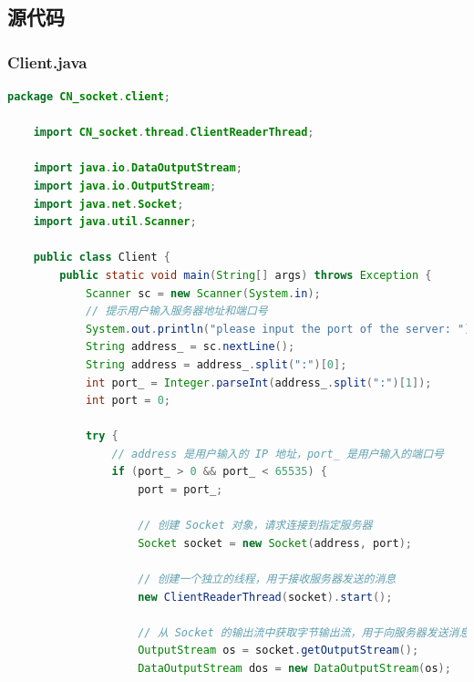 \documentclass{article}
\begin{document}
	\subsection{源代码}
	
	\subsubsection{Client.java}
	
	\begin{lstlisting}[language=Java, title=Client.java, tabsize=4]
    package CN_socket.client;
    
    import CN_socket.thread.ClientReaderThread;
    
    import java.io.DataOutputStream;
    import java.io.OutputStream;
    import java.net.Socket;
    import java.util.Scanner;
    
    public class Client {
        public static void main(String[] args) throws Exception {
            Scanner sc = new Scanner(System.in);
            // 提示用户输入服务器地址和端口号
            System.out.println("please input the port of the server: ");
            String address_ = sc.nextLine();
            String address = address_.split(":")[0];
            int port_ = Integer.parseInt(address_.split(":")[1]);
            int port = 0;
            
            try {
            	// address 是用户输入的 IP 地址，port_ 是用户输入的端口号
            	if (port_ > 0 && port_ < 65535) {
            		port = port_;
            		
            		// 创建 Socket 对象，请求连接到指定服务器
            		Socket socket = new Socket(address, port);
            		
            		// 创建一个独立的线程，用于接收服务器发送的消息
            		new ClientReaderThread(socket).start();
            		
            		// 从 Socket 的输出流中获取字节输出流，用于向服务器发送消息
            		OutputStream os = socket.getOutputStream();
            		DataOutputStream dos = new DataOutputStream(os);
            		

\end{lstlisting}
\end{document}
